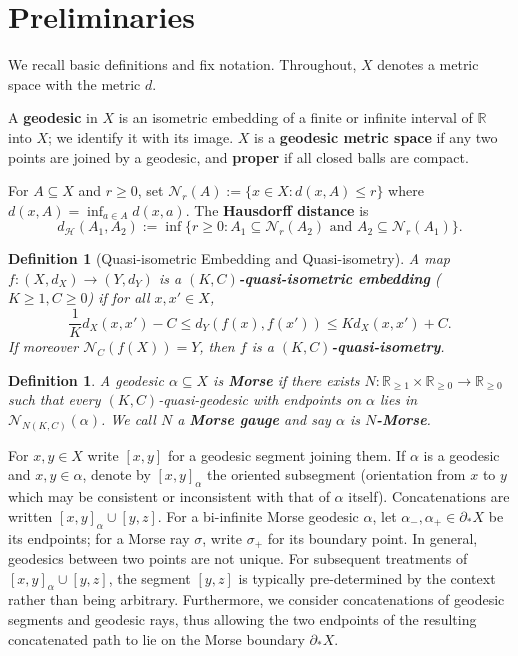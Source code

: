 \documentclass[a4paper,11pt,oneside]{article}
\newtheorem{Definition}[Theorem]{Definition}
\begin{document}
\section{Preliminaries}

We recall basic definitions and fix notation. Throughout, $X$ denotes a metric space with the metric $d$.

A \textbf{geodesic} in $X$ is an isometric embedding of a finite or infinite interval of $\mathbb{R}$ into $X$; we identify it with its image.
$X$ is a \textbf{geodesic metric space} if any two points are joined by a geodesic, and \textbf{proper} if all closed balls are compact.

For $A\subseteq X$ and $r\ge0$, set $\mathcal{N}_r(A):=\{x\in X:d(x,A)\le r\}$ where $d(x,A)=\inf_{a\in A}d(x,a)$. The \textbf{Hausdorff distance} is
\[
d_{\mathcal{H}}(A_1,A_2):=\inf\{r\ge0:A_1\subseteq\mathcal{N}_r(A_2)\text{ and }A_2\subseteq\mathcal{N}_r(A_1)\}.
\]

\begin{Definition}[Quasi-isometric Embedding and Quasi-isometry]
A map $f:(X,d_X)\to(Y,d_Y)$ is a \textbf{$(K,C)$-quasi-isometric embedding} ($K\ge1,C\ge0$) if for all $x,x'\in X$,
\[
\frac{1}{K}d_X(x,x')-C\le d_Y(f(x),f(x'))\le Kd_X(x,x')+C.
\]
If moreover $\mathcal{N}_C(f(X))=Y$, then $f$ is a \textbf{$(K,C)$-quasi-isometry}.
\end{Definition}

\begin{Definition}\label{def:morse}
A geodesic $\alpha\subseteq X$ is \textbf{Morse} if there exists $N:\mathbb{R}_{\ge1}\times\mathbb{R}_{\ge0}\to\mathbb{R}_{\ge0}$ such that every $(K,C)$-quasi-geodesic with endpoints on $\alpha$ lies in $\mathcal{N}_{N(K,C)}(\alpha)$. We call $N$ a \textbf{Morse gauge} and say $\alpha$ is \textbf{$N$-Morse}.
\end{Definition}

For $x,y\in X$ write $[x,y]$ for a geodesic segment joining them. If $\alpha$ is a geodesic and $x,y\in\alpha$, denote by $[x,y]_\alpha$ the oriented subsegment (orientation from $x$ to $y$ which may be consistent or inconsistent with that of $\alpha$ itself). Concatenations are written $[x,y]_\alpha\cup[y,z]$. For a bi-infinite Morse geodesic $\alpha$, let $\alpha_-,\alpha_+\in\partial_*X$ be its endpoints; for a Morse ray $\sigma$, write $\sigma_+$ for its boundary point.
In general, geodesics between two points are not unique. For subsequent treatments of $[x,y]_{\alpha}\cup [y,z]$, the segment $[y,z]$ is typically pre-determined by the context rather than being arbitrary. Furthermore, we consider concatenations of geodesic segments and geodesic rays, thus allowing the two endpoints of the resulting concatenated path to lie on the Morse boundary $\partial_* X$. 
\end{document}
